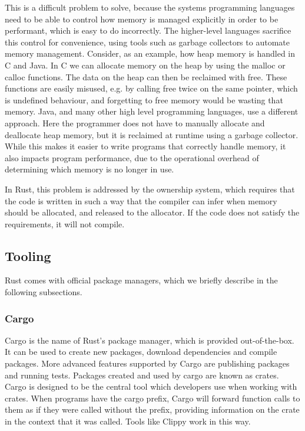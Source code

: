 \documentclass{article}
\begin{document}
This is a difficult problem to solve, because the systems programming languages need to be able to control how memory is managed explicitly in order to be performant, which is easy to do incorrectly. The higher-level languages sacrifice this control for convenience, using tools such as garbage collectors to automate memory management.
Consider, as an example, how heap memory is handled in C and Java. In C we can allocate memory on the heap by using the malloc or calloc functions. The data on the heap can then be reclaimed with free. These functions are easily misused, e.g. by calling free twice on the same pointer, which is undefined behaviour, and forgetting to free memory would be wasting that memory.
Java, and many other high level programming languages, use a different approach. Here the programmer does not have to manually allocate and deallocate heap memory, but it is reclaimed at runtime using a garbage collector. While this makes it easier to write programs that correctly handle memory, it also impacts program performance, due to the operational overhead of determining which memory is no longer in use.

In Rust, this problem is addressed by the ownership system, which requires that the code is written in such a way that the compiler can infer when memory should be allocated, and released to the allocator. If the code does not satisfy the requirements, it will not compile.

\subsection{Tooling}
Rust comes with official package managers, which we briefly describe in the following subsections.

\subsubsection{Cargo}
Cargo is the name of Rust’s package manager, which is provided out-of-the-box. It can be used to create new packages, download dependencies and compile packages. More advanced features supported by Cargo are publishing packages and running tests. Packages created and used by cargo are known as crates. Cargo is designed to be the central tool which developers use when working with crates. When programs have the cargo prefix, Cargo will forward function calls to them as if they were called without the prefix, providing information on the crate in the context that it was called. Tools like Clippy work in this way.
\end{document}
